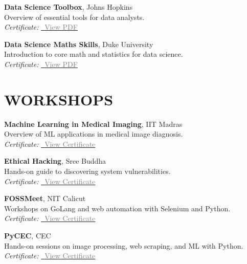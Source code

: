 \documentclass[11pt,a4paper]{article}
\begin{document}
\textbf{Data Science Toolbox}, Johns Hopkins \\
Overview of essential tools for data analysts. \\
\textit{Certificate:} \href{https://coursera.org/share/bd0023b71386ae9c7246bad3d5b566a7}{\faFilePdfO~\textcolor{gray}{View PDF}}

\textbf{Data Science Maths Skills}, Duke University \\
Introduction to core math and statistics for data science. \\
\textit{Certificate:} \href{https://coursera.org/share/4bcf67532cd1ae69781e51db0bbb3445}{\faFilePdfO~\textcolor{gray}{View PDF}}

\section*{WORKSHOPS}
\textbf{Machine Learning in Medical Imaging}, IIT Madras \\
Overview of ML applications in medical image diagnosis. \\
\textit{Certificate:} \href{https://jishnujp.github.io/certificates/mlmedic.jpg}{\faFilePdfO~\textcolor{gray}{View Certificate}}

\textbf{Ethical Hacking}, Sree Buddha \\
Hands-on guide to discovering system vulnerabilities. \\
\textit{Certificate:} \href{https://jishnujp.github.io/certificates/ethical_hacking.jpg}{\faFilePdfO~\textcolor{gray}{View Certificate}}

\textbf{FOSSMeet}, NIT Calicut \\
Workshops on GoLang and web automation with Selenium and Python. \\
\textit{Certificate:} \href{https://jishnujp.github.io/certificates/fossmeet.jpg}{\faFilePdfO~\textcolor{gray}{View Certificate}}

\textbf{PyCEC}, CEC \\
Hands-on sessions on image processing, web scraping, and ML with Python. \\
\textit{Certificate:} \href{https://jishnujp.github.io/certificates/pycec.jpg}{\faFilePdfO~\textcolor{gray}{View Certificate}}
\end{document}
